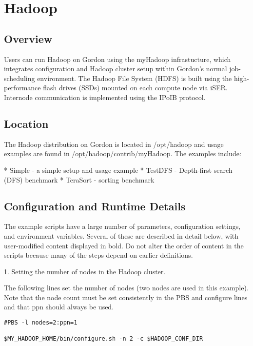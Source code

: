 \section{Hadoop}

\subsection{Overview}

Users can run Hadoop on Gordon using the myHadoop infrastucture, which
integrates configuration and Hadoop cluster setup within Gordon's
normal job-scheduling environment. The Hadoop File System (HDFS) is
built using the high-performance flash drives (SSDs) mounted on each
compute node via iSER. Internode communication is implemented using
the IPoIB protocol.

\subsection{Location}

The Hadoop distribution on Gordon is located in /opt/hadoop and usage
examples are found in /opt/hadoop/contrib/myHadoop. The examples
include:

* Simple - a simple setup and usage example
* TestDFS - Depth-first search (DFS) benchmark
* TeraSort - sorting benchmark

\subsection{Configuration and Runtime Details}

The example scripts have a large number of parameters, configuration
settings, and environment variables. Several of these are described in
detail below, with user-modified content displayed in bold. Do not
alter the order of content in the scripts because many of the steps
depend on earlier definitions.

1. Setting the number of nodes in the Hadoop cluster.

The following lines set the number of nodes (two nodes are used in
this example). Note that the node count must be set consistently in
the PBS and configure lines and that ppn should always be used.

\begin{verbatim}
#PBS -l nodes=2:ppn=1

$MY_HADOOP_HOME/bin/configure.sh -n 2 -c $HADOOP_CONF_DIR
\end{verbatim}

